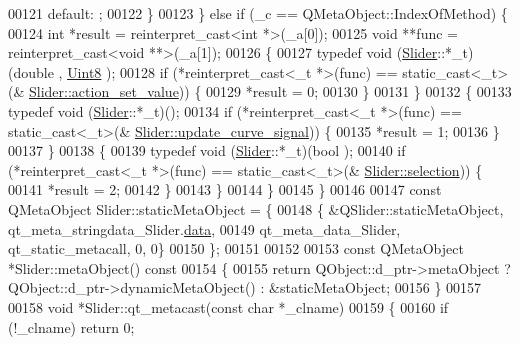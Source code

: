 \begin{DoxyCode}
00121         \textcolor{keywordflow}{default}: ;
00122         \}
00123     \} \textcolor{keywordflow}{else} \textcolor{keywordflow}{if} (\_c == QMetaObject::IndexOfMethod) \{
00124         \textcolor{keywordtype}{int} *result = \textcolor{keyword}{reinterpret\_cast<}\textcolor{keywordtype}{int} *\textcolor{keyword}{>}(\_a[0]);
00125         \textcolor{keywordtype}{void} **func = \textcolor{keyword}{reinterpret\_cast<}\textcolor{keywordtype}{void} **\textcolor{keyword}{>}(\_a[1]);
00126         \{
00127             \textcolor{keyword}{typedef} void (\hyperlink{a00024}{Slider}::*\_t)(double , \hyperlink{a00001_a979e3e23b9a449e69ab6a8a83b6042f8}{Uint8} );
00128             \textcolor{keywordflow}{if} (*reinterpret\_cast<\_t *>(func) == \textcolor{keyword}{static\_cast<}\_t\textcolor{keyword}{>}(&
      \hyperlink{a00024_a886f07f2c612121bec703581f9398a10}{Slider::action\_set\_value})) \{
00129                 *result = 0;
00130             \}
00131         \}
00132         \{
00133             \textcolor{keyword}{typedef} void (\hyperlink{a00024}{Slider}::*\_t)();
00134             \textcolor{keywordflow}{if} (*reinterpret\_cast<\_t *>(func) == \textcolor{keyword}{static\_cast<}\_t\textcolor{keyword}{>}(&
      \hyperlink{a00024_a49696761b5c638a3b2d58b16af9773e0}{Slider::update\_curve\_signal})) \{
00135                 *result = 1;
00136             \}
00137         \}
00138         \{
00139             \textcolor{keyword}{typedef} void (\hyperlink{a00024}{Slider}::*\_t)(bool );
00140             \textcolor{keywordflow}{if} (*reinterpret\_cast<\_t *>(func) == \textcolor{keyword}{static\_cast<}\_t\textcolor{keyword}{>}(&
      \hyperlink{a00024_a66bf875d43a16cf37527ab75c439fd8e}{Slider::selection})) \{
00141                 *result = 2;
00142             \}
00143         \}
00144     \}
00145 \}
00146 
00147 \textcolor{keyword}{const} QMetaObject Slider::staticMetaObject = \{
00148     \{ &QSlider::staticMetaObject, qt\_meta\_stringdata\_Slider.\hyperlink{a00019_a28e23ecab9373bb818a81f9a092a52de}{data},
00149       qt\_meta\_data\_Slider,  qt\_static\_metacall, 0, 0\}
00150 \};
00151 
00152 
00153 \textcolor{keyword}{const} QMetaObject *Slider::metaObject()\textcolor{keyword}{ const}
00154 \textcolor{keyword}{}\{
00155     \textcolor{keywordflow}{return} QObject::d\_ptr->metaObject ? QObject::d\_ptr->dynamicMetaObject() : &staticMetaObject;
00156 \}
00157 
00158 \textcolor{keywordtype}{void} *Slider::qt\_metacast(\textcolor{keyword}{const} \textcolor{keywordtype}{char} *\_clname)
00159 \{
00160     \textcolor{keywordflow}{if} (!\_clname) \textcolor{keywordflow}{return} 0;

\end{DoxyCode}
